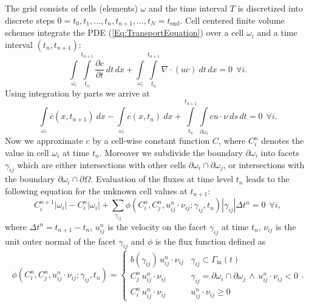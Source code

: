 \documentclass[11pt,a4paper,headinclude,footinclude,DIV16,headings=normal]{scrreprt}
\begin{document}
The grid consists of cells (elements) $\omega$ and the time interval
$T$ is discretized into discrete steps $0=t_0, t_1, \ldots, t_n,
t_{n+1},\ldots, t_N=t_{\text{end}}$. Cell centered finite volume schemes
integrate the PDE (\ref{Eq:TransportEquation}) over a cell $\omega_i$
and a time interval $(t_n,t_{n+1})$:
\begin{equation}
\int\limits_{\omega_i}\int\limits_{t_n}^{t_{n+1}}\frac{\partial
  c}{\partial t}\ dt\,dx +
\int\limits_{\omega_i}\int\limits_{t_n}^{t_{n+1}} \nabla\cdot (uc) \
dt\,dx = 0 \ \ \forall i.
\label{Eq:TransportEquationIntegrated}
\end{equation}
Using integration by parts we arrive at
\begin{equation}
\int\limits_{\omega_i} c(x,t_{n+1})\ dx - \int\limits_{\omega_i}
c(x,t_{n})\ dx + \int\limits_{t_n}^{t_{n+1}}
\int\limits_{\partial\omega_i} c u\cdot\nu\ ds\,dt = 0 \ \ \forall i.
\end{equation}
Now we approximate $c$ by a cell-wise constant function $C$, where
$C_i^n$ denotes the value in cell $\omega_i$ at time $t_n$.
Moreover we subdivide the boundary $\partial\omega_i$ into
facets $\gamma_{ij}$ which are either intersections with
other cells $\partial\omega_i\cap\partial\omega_j$,
or intersections with the boundary
$\partial\omega_i\cap\partial\Omega$.
Evaluation of the fluxes
at time level $t_n$ leads to the following equation for the unknown
cell values at $t_{n+1}$:
\begin{equation}
C_i^{n+1}|\omega_i| - C_i^{n}|\omega_i| + \sum\limits_{\gamma_{ij}}
\phi(C_i^n, C_j^n, u_{ij}^n\cdot\nu_{ij}; \gamma_{ij}, t_n )
|\gamma_{ij}| \Delta t^n = 0 \ \ \forall i,
\label{Eq:DiscreteForm}
\end{equation}
where $\Delta t^n=t_{n+1}-t_n$, $u_{ij}^n$ is the velocity on the facet $\gamma_{ij}$ at time
$t_n$, $\nu_{ij}$ is the unit outer normal of the facet $\gamma_{ij}$ and $\phi$ is the flux function defined as
\begin{equation}
\phi(C_i^n, C_j^n, u_{ij}^n\cdot\nu_{ij}; \gamma_{ij}, t_n ) =
\left\{\begin{array}{ll}
b(\gamma_{ij})\, u_{ij}^n\cdot\nu_{ij} & \gamma_{ij} \subset \Gamma_{\text{in}}(t) \\
C_j^n\, u_{ij}^n\cdot\nu_{ij}&
\gamma_{ij}=\partial\omega_i\cap\partial\omega_j\,\wedge\,u_{ij}^n\cdot\nu_{ij} < 0\\
C_i^n\, u_{ij}^n\cdot\nu_{ij}& u_{ij}^n\cdot\nu_{ij} \geq 0
\end{array}\right..
\end{equation}
\end{document}
